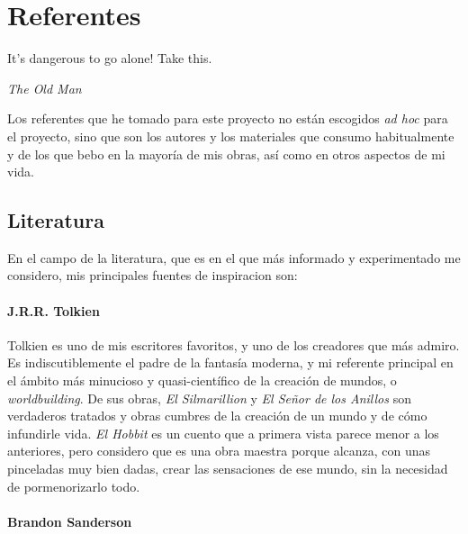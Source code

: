 \documentclass[twoside]{article}
\begin{document}
  \hypertarget{referentes}{%
  \section{Referentes}\label{referentes}}
  \epigraph{It's dangerous to go alone! Take this.}{\textit{The Old Man}}
  \begin{multicols}{2}
    
    \lettrine[nindent=0em,lines=3]{L}os referentes que he tomado para este proyecto no están escogidos
    \emph{ad hoc} para el proyecto, sino que son los autores y los
    materiales que consumo habitualmente y de los que bebo en la mayoría de
    mis obras, así como en otros aspectos de mi vida.
    
    \hypertarget{literatura}{%
    \subsection{Literatura}\label{literatura}}
    
    En el campo de la literatura, que es en el que más informado y
    experimentado me considero, mis principales fuentes de inspiracion son:
    
  \hypertarget{j.r.r.-tolkien}{%
  \paragraph{J.R.R. Tolkien}\label{j.r.r.-tolkien}}
  
  Tolkien es uno de mis escritores favoritos, y uno de los creadores que
  más admiro. Es indiscutiblemente el padre de la fantasía moderna, y mi
  referente principal en el ámbito más minucioso y quasi-científico de la
  creación de mundos, o \emph{worldbuilding}. De sus obras,
  \emph{El Silmarillion}\autocite*{silmarillion} y \emph{El Señor de los Anillos}\autocite*{esdla} son verdaderos
  tratados y obras cumbres de la creación de un mundo y de cómo infundirle
  vida. \emph{El Hobbit}\autocite*{hobbit} es un cuento que a primera vista parece menor a
  los anteriores, pero considero que es una obra maestra porque alcanza,
  con unas pinceladas muy bien dadas, crear las sensaciones de ese mundo,
  sin la necesidad de pormenorizarlo todo.
  
  \hypertarget{brandon-sanderson}{%
  \paragraph{Brandon Sanderson}\label{brandon-sanderson}}
  

\end{multicols}
\end{document}
